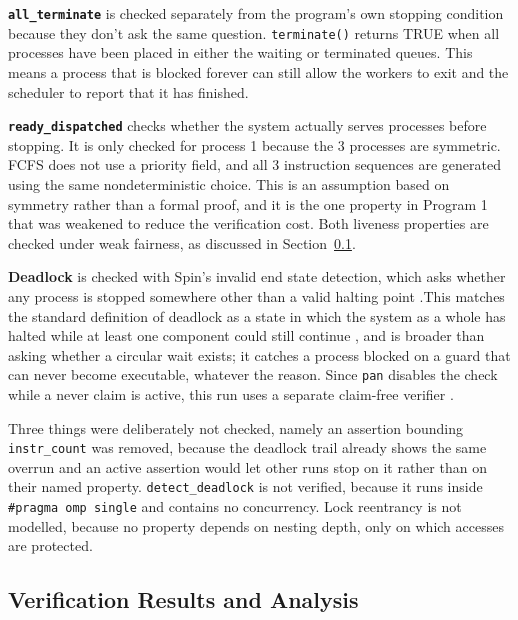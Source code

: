 \documentclass[10pt,a4paper]{article}
\newcommand{\code}[1]{\texttt{#1}}
\begin{document}
\medskip\noindent

\textbf{\code{all\_terminate}} is checked separately from the program's own 
stopping condition because they don't ask the same question. 
\code{terminate()} returns TRUE when all processes have been placed in either 
the waiting or terminated queues. This means a process that is blocked 
forever can still allow the workers to exit and the scheduler to report that 
it has finished.

\medskip\noindent

\textbf{\code{ready\_dispatched}} checks whether the system actually serves 
processes before stopping. It is only checked for process 1 because the 3 
processes are symmetric. FCFS does not use a priority field, and all 3 
instruction sequences are generated using the same nondeterministic choice. 
This is an assumption based on symmetry rather than a formal 
proof, and it is the one property in Program 1 that was weakened to reduce 
the verification cost. Both liveness properties are checked under weak 
fairness, as discussed in Section~\ref{sec:results-1}.

\medskip\noindent
\textbf{Deadlock} is checked with Spin's invalid end state detection, which
asks whether any process is stopped somewhere other than a valid halting
point \cite{inggs_properties}.This matches the standard definition of
deadlock as a state in which the system as a whole has halted while at
least one component could still continue \cite{baier2008}, and is broader
than asking whether a circular wait exists; it catches a process blocked
on a guard that can never become executable, whatever the reason. Since \code{pan}
disables the check while a never claim is active, this run uses a separate
claim-free verifier \cite{spin_pan}.

\medskip\noindent
Three things were deliberately not checked, namely an assertion bounding
\code{instr\_count} was removed, because the deadlock trail already shows the
same overrun and an active assertion would let other runs stop on it rather
than on their named property. \code{detect\_deadlock} is not verified, because
it runs inside \code{\#pragma omp single} and contains no concurrency. Lock
reentrancy is not modelled, because no property depends on nesting depth,
only on which accesses are protected.

\subsection{Verification Results and Analysis}
\label{sec:results-1}
\end{document}
